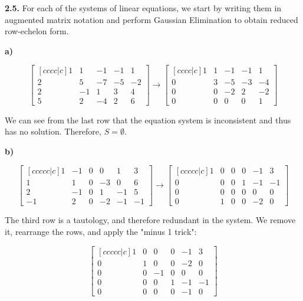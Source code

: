 \documentclass{article}
\begin{document}
\textbf{2.5.} For each of the systems of linear equations, we start by writing them in augmented matrix notation and perform Gaussian Elimination to obtain reduced row-echelon form.

\textbf{a)}

\[
\begin{bmatrix}[c c c c | c]
    1 & 1 & -1 & -1 & 1\\
    2 & 5 & -7 & -5 & -2\\
    2 & -1 & 1 & 3 & 4\\
    5 & 2 & -4 & 2 & 6
\end{bmatrix} \rightarrow \begin{bmatrix}[c c c c | c]
    1 & 1 & -1 & -1 & 1\\
    0 & 3 & -5 & -3 & -4\\
    0 & 0 & -2 & 2 & -2\\
    0 & 0 & 0 & 0 & 1
\end{bmatrix}
\]

We can see from the last row that the equation system is inconsistent and thus has no solution. Therefore, $S = \emptyset$.

\textbf{b)}

\[
\begin{bmatrix}[c c c c c | c]
    1 & -1 & 0 & 0 & 1 & 3\\
    1 & 1 & 0 & -3 & 0 & 6\\
    2 & -1 & 0 & 1 & -1 & 5\\
    -1 & 2 & 0 & -2 & -1 & -1
\end{bmatrix} \rightarrow \begin{bmatrix}[c c c c c | c]
    1 & 0 & 0 & 0 & -1 & 3\\
    0 & 0 & 0 & 1 & -1 & -1\\
    0 & 0 & 0 & 0 & 0 & 0\\
    0 & 1 & 0 & 0 & -2 & 0
\end{bmatrix}
\]

The third row is a tautology, and therefore redundant in the system. We remove it, rearrange the rows, and apply the "minus 1 trick":

\[
\begin{bmatrix}[c c c c c | c]
    1 & 0 & 0 & 0 & -1 & 3\\
    0 & 1 & 0 & 0 & -2 & 0\\
    0 & 0 & -1 & 0 & 0 & 0\\
    0 & 0 & 0 & 1 & -1 & -1\\
    0 & 0 & 0 & 0 & -1 & 0
\end{bmatrix}
\]
\end{document}
